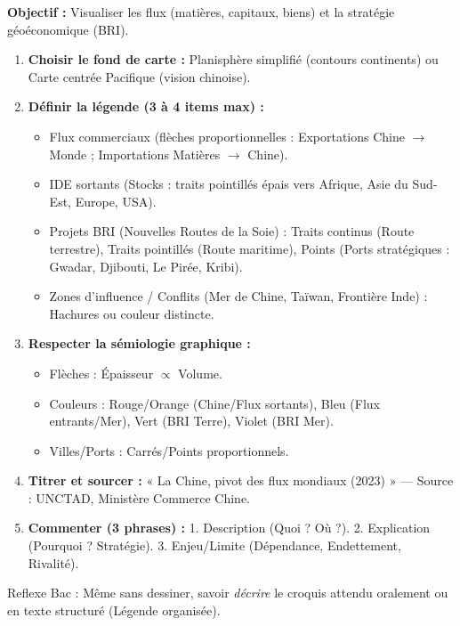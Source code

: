 \documentclass[11pt]{article}
\newcommand{\cle}[1]{{\popxbold\color{popdark}#1}}
\begin{document}
\begin{methode}
\textbf{Objectif :} Visualiser les flux (matières, capitaux, biens) et la stratégie géoéconomique (BRI).
\begin{enumerate}
    \item \textbf{Choisir le fond de carte :} Planisphère simplifié (contours continents) ou Carte centrée Pacifique (vision chinoise).
    \item \textbf{Définir la légende (3 à 4 items max) :} 
    \begin{itemize}
        \item Flux commerciaux (flèches proportionnelles : Exportations Chine $\rightarrow$ Monde ; Importations Matières $\rightarrow$ Chine).
        \item IDE sortants (Stocks : traits pointillés épais vers Afrique, Asie du Sud-Est, Europe, USA).
        \item Projets BRI (Nouvelles Routes de la Soie) : Traits continus (Route terrestre), Traits pointillés (Route maritime), Points (Ports stratégiques : Gwadar, Djibouti, Le Pirée, Kribi).
        \item Zones d'influence / Conflits (Mer de Chine, Taïwan, Frontière Inde) : Hachures ou couleur distincte.
    \end{itemize}
    \item \textbf{Respecter la sémiologie graphique :} 
    \begin{itemize}
        \item Flèches : Épaisseur $\propto$ Volume.
        \item Couleurs : Rouge/Orange (Chine/Flux sortants), Bleu (Flux entrants/Mer), Vert (BRI Terre), Violet (BRI Mer).
        \item Villes/Ports : Carrés/Points proportionnels.
    \end{itemize}
    \item \textbf{Titrer et sourcer :} « La Chine, pivot des flux mondiaux (2023) » — Source : UNCTAD, Ministère Commerce Chine.
    \item \textbf{Commenter (3 phrases) :} 1. Description (Quoi ? Où ?). 2. Explication (Pourquoi ? Stratégie). 3. Enjeu/Limite (Dépendance, Endettement, Rivalité).
\end{enumerate}
\cle{Reflexe Bac :} Même sans dessiner, savoir \emph{décrire} le croquis attendu oralement ou en texte structuré (Légende organisée).
\end{methode}
\end{document}
